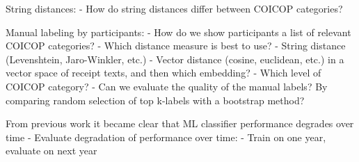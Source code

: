 \documentclass{article}
\begin{document}
String distances:
- How do string distances differ between COICOP categories?

Manual labeling by participants:
- How do we show participants a list of relevant COICOP categories?
    - Which distance measure is best to use?
        - String distance (Levenshtein, Jaro-Winkler, etc.)
        - Vector distance (cosine, euclidean, etc.) in a vector space of receipt texts, and then which embedding?
- Which level of COICOP category?
- Can we evaluate the quality of the manual labels? By comparing random selection of top k-labels with a 
bootstrap method?

From previous work it became clear that ML classifier performance degrades over time
- Evaluate degradation of performance over time:
    - Train on one year, evaluate on next year
\end{document}
